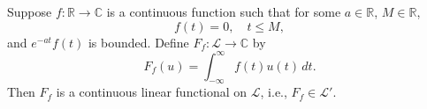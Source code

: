 Suppose $f: \mathbb{R} \to \mathbb{C}$ is a continuous function such that for some $a \in \mathbb{R}$, $M \in \mathbb{R}$,
$$f(t) = 0, \quad t \leq M,$$
and $e^{-at}f(t)$ is bounded. Define $F_f: \mathcal{L} \to \mathbb{C}$ by
$$F_f(u) = \int_{-\infty}^{\infty} f(t) u(t) \, dt.$$
Then $F_f$ is a continuous linear functional on $\mathcal{L}$, i.e., $F_f \in \mathcal{L}'$.
